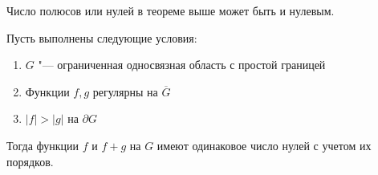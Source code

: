 \begin{note}
	Число полюсов или нулей в теореме выше может быть и нулевым.
\end{note}

\begin{theorem}[Руше]
	Пусть выполнены следующие условия:
	\begin{enumerate}
		\item $G$ "--- ограниченная односвязная область с простой границей
		
		
		\item Функции $f, g$ регулярны на $\overline{G}$
		
		\item $|f| > |g|$ на $\partial G$
	\end{enumerate}
	
	Тогда функции $f$ и $f+g$ на $G$ имеют одинаковое число нулей с учетом их порядков.
\end{theorem}

